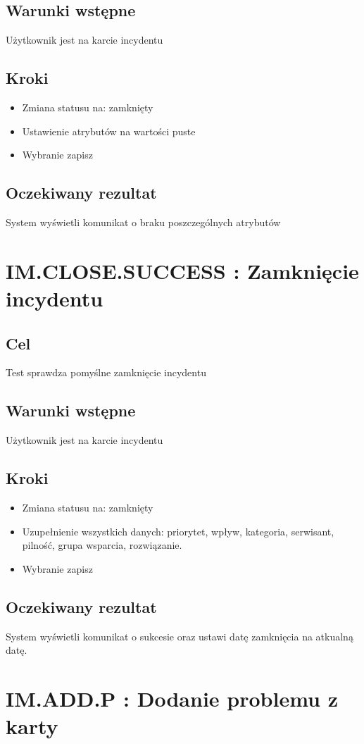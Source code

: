 \documentclass[a4paper, oneside, 11pt]{report}
\begin{document}
\subsection*{Warunki wstępne}
Użytkownik jest na karcie incydentu
\subsection*{Kroki}
\begin{itemize}
	\item Zmiana statusu na: zamknięty
	\item Ustawienie atrybutów na wartości puste
	\item Wybranie zapisz
\end{itemize}
\subsection*{Oczekiwany rezultat}
System wyświetli komunikat o braku poszczególnych atrybutów

\section{IM.CLOSE.SUCCESS : Zamknięcie incydentu}
\subsection*{Cel}
Test sprawdza pomyślne zamknięcie incydentu
\subsection*{Warunki wstępne}
Użytkownik jest na karcie incydentu
\subsection*{Kroki}
\begin{itemize}
	\item Zmiana statusu na: zamknięty
	\item Uzupełnienie wszystkich danych: priorytet, wpływ, kategoria, serwisant, pilność, grupa wsparcia, rozwiązanie.
	\item Wybranie zapisz
\end{itemize}
\subsection*{Oczekiwany rezultat}
System wyświetli komunikat o sukcesie oraz ustawi datę zamknięcia na atkualną datę.

\section{IM.ADD.P : Dodanie problemu z karty}
\end{document}
